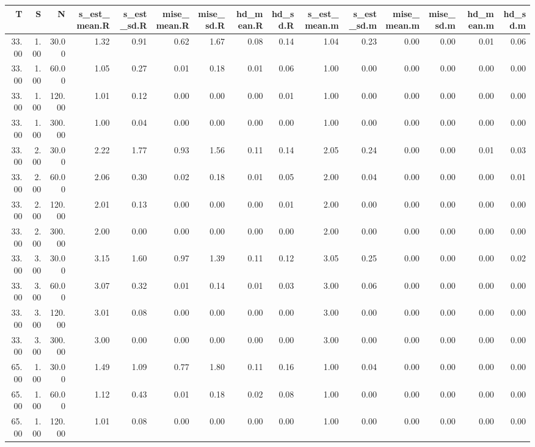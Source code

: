 \begin{table}[ht]
\centering
\begin{tabular}{rrrrrrrrrrrrrrr}
  \hline
T & S & N & s\_est\_mean.R & s\_est\_sd.R & mise\_mean.R & mise\_sd.R & hd\_mean.R & hd\_sd.R & s\_est\_mean.m & s\_est\_sd.m & mise\_mean.m & mise\_sd.m & hd\_mean.m & hd\_sd.m \\ 
  \hline
33.00 & 1.00 & 30.00 & 1.32 & 0.91 & 0.62 & 1.67 & 0.08 & 0.14 & 1.04 & 0.23 & 0.00 & 0.00 & 0.01 & 0.06 \\ 
  33.00 & 1.00 & 60.00 & 1.05 & 0.27 & 0.01 & 0.18 & 0.01 & 0.06 & 1.00 & 0.00 & 0.00 & 0.00 & 0.00 & 0.00 \\ 
  33.00 & 1.00 & 120.00 & 1.01 & 0.12 & 0.00 & 0.00 & 0.00 & 0.01 & 1.00 & 0.00 & 0.00 & 0.00 & 0.00 & 0.00 \\ 
  33.00 & 1.00 & 300.00 & 1.00 & 0.04 & 0.00 & 0.00 & 0.00 & 0.00 & 1.00 & 0.00 & 0.00 & 0.00 & 0.00 & 0.00 \\ 
  33.00 & 2.00 & 30.00 & 2.22 & 1.77 & 0.93 & 1.56 & 0.11 & 0.14 & 2.05 & 0.24 & 0.00 & 0.00 & 0.01 & 0.03 \\ 
  33.00 & 2.00 & 60.00 & 2.06 & 0.30 & 0.02 & 0.18 & 0.01 & 0.05 & 2.00 & 0.04 & 0.00 & 0.00 & 0.00 & 0.01 \\ 
  33.00 & 2.00 & 120.00 & 2.01 & 0.13 & 0.00 & 0.00 & 0.00 & 0.01 & 2.00 & 0.00 & 0.00 & 0.00 & 0.00 & 0.00 \\ 
  33.00 & 2.00 & 300.00 & 2.00 & 0.00 & 0.00 & 0.00 & 0.00 & 0.00 & 2.00 & 0.00 & 0.00 & 0.00 & 0.00 & 0.00 \\ 
  33.00 & 3.00 & 30.00 & 3.15 & 1.60 & 0.97 & 1.39 & 0.11 & 0.12 & 3.05 & 0.25 & 0.00 & 0.00 & 0.00 & 0.02 \\ 
  33.00 & 3.00 & 60.00 & 3.07 & 0.32 & 0.01 & 0.14 & 0.01 & 0.03 & 3.00 & 0.06 & 0.00 & 0.00 & 0.00 & 0.00 \\ 
  33.00 & 3.00 & 120.00 & 3.01 & 0.08 & 0.00 & 0.00 & 0.00 & 0.00 & 3.00 & 0.00 & 0.00 & 0.00 & 0.00 & 0.00 \\ 
  33.00 & 3.00 & 300.00 & 3.00 & 0.00 & 0.00 & 0.00 & 0.00 & 0.00 & 3.00 & 0.00 & 0.00 & 0.00 & 0.00 & 0.00 \\ 
  65.00 & 1.00 & 30.00 & 1.49 & 1.09 & 0.77 & 1.80 & 0.11 & 0.16 & 1.00 & 0.04 & 0.00 & 0.00 & 0.00 & 0.00 \\ 
  65.00 & 1.00 & 60.00 & 1.12 & 0.43 & 0.01 & 0.18 & 0.02 & 0.08 & 1.00 & 0.00 & 0.00 & 0.00 & 0.00 & 0.00 \\ 
  65.00 & 1.00 & 120.00 & 1.01 & 0.08 & 0.00 & 0.00 & 0.00 & 0.00 & 1.00 & 0.00 & 0.00 & 0.00 & 0.00 & 0.00 \\ 

\end{tabular}
\end{table}
